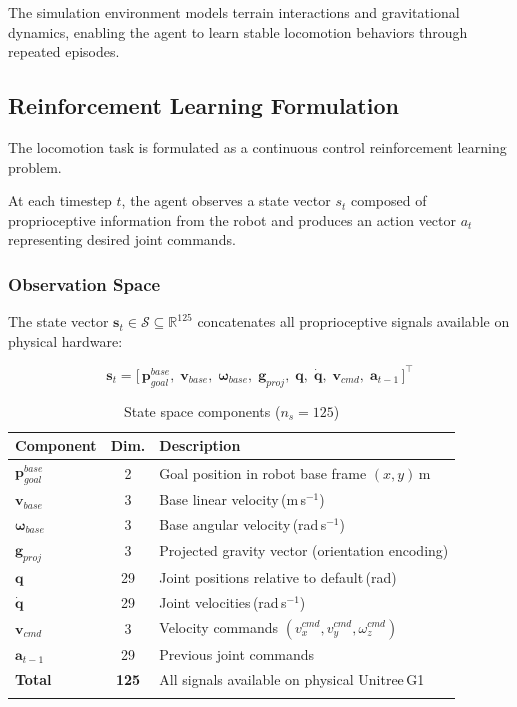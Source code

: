 \documentclass[pdflatex,sn-mathphys-num]{sn-jnl}%
\theoremstyle{thmstyleone}%
\theoremstyle{thmstyletwo}%
\theoremstyle{thmstylethree}%
\begin{document}
The simulation environment models terrain interactions and gravitational dynamics, enabling the agent to learn stable locomotion behaviors through repeated episodes.

\subsection{Reinforcement Learning Formulation}
The locomotion task is formulated as a continuous control reinforcement learning problem.

At each timestep $t$, the agent observes a state vector $s_t$ composed of proprioceptive information from the robot and produces an action vector $a_t$ representing desired joint commands.

\subsubsection{Observation Space}
The state vector $\mathbf{s}_t \in \mathcal{S} \subseteq \mathbb{R}^{125}$ concatenates
all proprioceptive signals available on physical hardware:

\begin{equation}
\mathbf{s}_t = \bigl[\,
  \mathbf{p}_{goal}^{base},\;
  \mathbf{v}_{base},\;
  \boldsymbol{\omega}_{base},\;
  \mathbf{g}_{proj},\;
  \mathbf{q},\;
  \dot{\mathbf{q}},\;
  \mathbf{v}_{cmd},\;
  \mathbf{a}_{t-1}
\,\bigr]^\top
\label{eq:state}
\end{equation}

\begin{table}[ht]
\caption{State space components ($n_s = 125$)}\label{tab:state}%
\begin{tabular}{@{}lcp{6cm}@{}}
\toprule
Component & Dim. & Description \\
\midrule
$\mathbf{p}_{goal}^{base}$ & 2  & Goal position in robot base frame $(x, y)$\,m \\
$\mathbf{v}_{base}$        & 3  & Base linear velocity\,(m\,s$^{-1}$) \\
$\boldsymbol{\omega}_{base}$ & 3 & Base angular velocity\,(rad\,s$^{-1}$) \\
$\mathbf{g}_{proj}$        & 3  & Projected gravity vector (orientation encoding) \\
$\mathbf{q}$               & 29 & Joint positions relative to default\,(rad) \\
$\dot{\mathbf{q}}$         & 29 & Joint velocities\,(rad\,s$^{-1}$) \\
$\mathbf{v}_{cmd}$         & 3  & Velocity commands $(v_x^{cmd}, v_y^{cmd}, \omega_z^{cmd})$ \\
$\mathbf{a}_{t-1}$         & 29 & Previous joint commands \\
\midrule
\textbf{Total} & \textbf{125} & All signals available on physical Unitree\,G1 \\
\botrule
\end{tabular}
\end{table}
\end{document}
